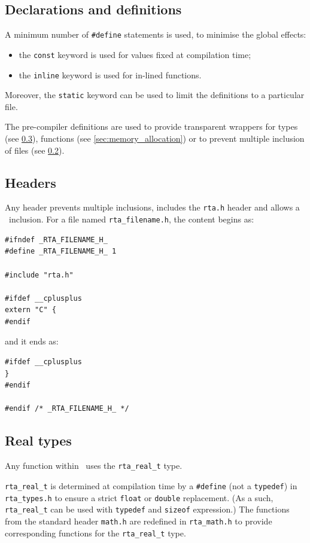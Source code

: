 \documentclass[a4paper, twoside]{article}
\begin{document}
\subsection{Declarations and definitions}
\label{sec:defines}

A minimum number of \texttt{\#define} statements is used, to minimise
the global effects:
\begin{itemize}
\item the \texttt{const} keyword is used for values fixed at
  compilation time;
\item the \texttt{inline} keyword is used for in-lined functions.
\end{itemize}
Moreover, the \texttt{static} keyword can be used to limit the
definitions to a particular file.

The pre-compiler definitions are used to provide transparent
wrappers for types (see \ref{sec:real_types}), functions (see
\ref{sec:memory_allocation}) or to prevent multiple inclusion of files
(see \ref{sec:headers}).

\subsection{Headers}
\label{sec:headers}

Any header prevents multiple inclusions, includes the \texttt{rta.h}
header and allows a \Cpp\ inclusion. For a file named
\texttt{rta\_filename.h}, the content begins as:
\begin{verbatim}
#ifndef _RTA_FILENAME_H_
#define _RTA_FILENAME_H_ 1

#include "rta.h"

#ifdef __cplusplus
extern "C" {
#endif
\end{verbatim}

and it ends as:
\begin{verbatim}
#ifdef __cplusplus
}
#endif

#endif /* _RTA_FILENAME_H_ */
\end{verbatim}

\subsection{Real types}
\label{sec:real_types}

Any function within \rta\ uses the \texttt{rta\_real\_t} type.

\texttt{rta\_real\_t} is determined at compilation time by a
\texttt{\#define} (not a \texttt{typedef}) in \texttt{rta\_types.h} to
ensure a strict \texttt{float} or \texttt{double} replacement. (As a
such, \texttt{rta\_real\_t} can be used with \texttt{typedef} and
\texttt{sizeof} expression.) The functions from the standard header
\texttt{math.h} are redefined in \texttt{rta\_math.h} to provide
corresponding functions for the \texttt{rta\_real\_t} type. 
\end{document}
